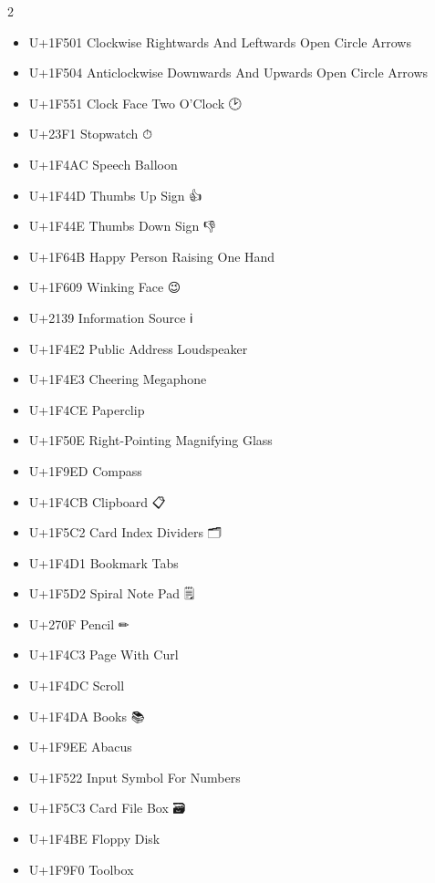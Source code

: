 \begin{multicols}{2}
\begin{itemize}
    \item U+1F501 Clockwise Rightwards And Leftwards Open Circle Arrows 🔁
    \item U+1F504 Anticlockwise Downwards And Upwards Open Circle Arrows 🔄
    \item U+1F551 Clock Face Two O'Clock           🕑
    \item U+23F1  Stopwatch                        ⏱
    \item U+1F4AC Speech Balloon                   💬
    \item U+1F44D Thumbs Up Sign                   👍
    \item U+1F44E Thumbs Down Sign                 👎
    \item U+1F64B Happy Person Raising One Hand    🙋
    \item U+1F609 Winking Face                     😉
    \item U+2139  Information Source               ℹ
    \item U+1F4E2 Public Address Loudspeaker       📢
    \item U+1F4E3 Cheering Megaphone               📣
    \item U+1F4CE Paperclip                        📎
    \item U+1F50E Right-Pointing Magnifying Glass  🔎
    \item U+1F9ED Compass                          🧭
    \item U+1F4CB Clipboard                        📋
    \item U+1F5C2 Card Index Dividers              🗂
    \item U+1F4D1 Bookmark Tabs                    📑
    \item U+1F5D2 Spiral Note Pad                  🗒
    \item U+270F  Pencil                           ✏
    \item U+1F4C3 Page With Curl                   📃
    \item U+1F4DC Scroll                           📜
    \item U+1F4DA Books                            📚
    \item U+1F9EE Abacus                           🧮
    \item U+1F522 Input Symbol For Numbers         🔢
    \item U+1F5C3 Card File Box                    🗃
    \item U+1F4BE Floppy Disk                      💾
    \item U+1F9F0 Toolbox                          🧰

\end{itemize}
\end{multicols}
